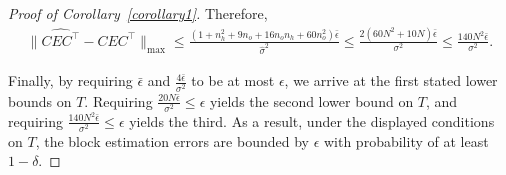\documentclass[11pt]{article}
\begin{document}
\begin{proof}[Proof of Corollary~\ref{corollary1}]
Therefore, 
    \begin{align*}
        \|\widehat{CEC^\top} - CEC^\top\|_{\max} \le \frac{(1+n_h^2+9n_o + 16n_o n_h + 60n_o^2)\bar{\epsilon}}{\hat{\sigma}^2}  \le \frac{2(60N^2+10N)\bar{\epsilon}}{\sigma^2} \le \frac{140N^2\bar{\epsilon}}{\sigma^2}.
    \end{align*} 


Finally, by requiring $\bar{\epsilon}$ and $\frac{4\bar{\epsilon}}{\sigma^2}$ to be at most $\epsilon$, we arrive at the first stated lower bounds on $T$. Requiring $\frac{20N\bar{\epsilon}}{\sigma^2} \le \epsilon$ yields the second lower bound on $T$, and requiring $\frac{140N^2\bar{\epsilon}}{\sigma^2} \le \epsilon$ yields the third. As a result, under the displayed conditions on $T$, the block estimation errors are bounded by $\epsilon$ with probability of at least $1-\delta$.
\end{proof}






\end{document}
